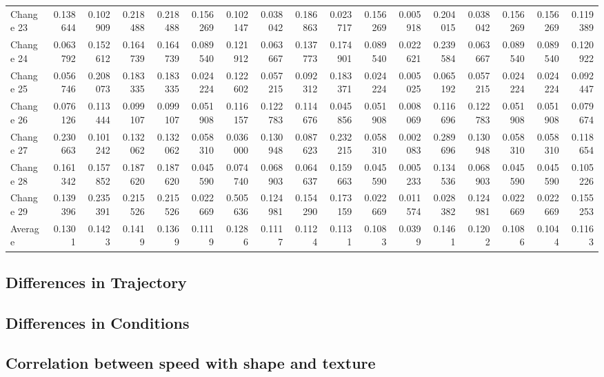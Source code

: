 \documentclass{article}
\begin{document}
\begin{landscape}
\begin{table}[htbp]
\begin{tabular}{lrrrrrrrrrrrrrrrr}
Change 23 & 0.138644 & 0.102909 & 0.218488 & 0.218488 & 0.156269 & 0.102147 & 0.038042 & 0.186863 & 0.023717 & 0.156269 & 0.005918 & 0.204015 & 0.038042 & 0.156269 & 0.156269 & 0.119389 \\
Change 24 & 0.063792 & 0.152612 & 0.164739 & 0.164739 & 0.089540 & 0.121912 & 0.063667 & 0.137773 & 0.174901 & 0.089540 & 0.022621 & 0.239584 & 0.063667 & 0.089540 & 0.089540 & 0.120922 \\
Change 25 & 0.056746 & 0.208073 & 0.183335 & 0.183335 & 0.024224 & 0.122602 & 0.057215 & 0.092312 & 0.183371 & 0.024224 & 0.005025 & 0.065192 & 0.057215 & 0.024224 & 0.024224 & 0.092447 \\
Change 26 & 0.076126 & 0.113444 & 0.099107 & 0.099107 & 0.051908 & 0.116157 & 0.122783 & 0.114676 & 0.045856 & 0.051908 & 0.008069 & 0.116696 & 0.122783 & 0.051908 & 0.051908 & 0.079674 \\
Change 27 & 0.230663 & 0.101242 & 0.132062 & 0.132062 & 0.058310 & 0.036000 & 0.130948 & 0.087623 & 0.232215 & 0.058310 & 0.002083 & 0.289696 & 0.130948 & 0.058310 & 0.058310 & 0.118654 \\
Change 28 & 0.161342 & 0.157852 & 0.187620 & 0.187620 & 0.045590 & 0.074740 & 0.068903 & 0.064637 & 0.159663 & 0.045590 & 0.005233 & 0.134536 & 0.068903 & 0.045590 & 0.045590 & 0.105226 \\
Change 29 & 0.139396 & 0.235391 & 0.215526 & 0.215526 & 0.022669 & 0.505636 & 0.124981 & 0.154290 & 0.173159 & 0.022669 & 0.011574 & 0.028382 & 0.124981 & 0.022669 & 0.022669 & 0.155253 \\
Average & 0.1301 & 0.1423 & 0.1419 & 0.1369 & 0.1119 & 0.1286 & 0.1117 & 0.1124 & 0.1131 & 0.1083 & 0.0399 & 0.1461 & 0.1202 & 0.1086 & 0.1044 & 0.1163 \\
\bottomrule
\end{tabular}
\end{table}
\end{landscape}



\subsection*{Differences in Trajectory}
\subsection*{Differences in Conditions}
\subsection*{Correlation between speed with shape and texture}
\end{document}
